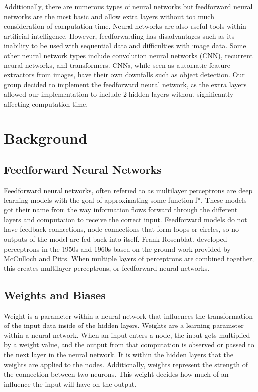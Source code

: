 \documentclass[twoside,twocolumn]{article}
\begin{document}
Additionally, there are numerous types of neural networks but feedforward neural networks are the most basic and allow extra layers without too much consideration of computation time.  Neural networks are also useful tools within artificial intelligence. However, feedforwarding has disadvantages such as its inability to be used with sequential data and difficulties with image data. Some other neural network types include convolution neural networks (CNN), recurrent neural networks, and transformers. CNNs, while seen as automatic feature extractors from images, have their own downfalls such as object detection. Our group decided to implement the feedforward neural network, as the extra layers allowed our implementation to include 2 hidden layers without significantly affecting computation time.\\


\section{Background}
\subsection{Feedforward Neural Networks}
Feedforward neural networks, often referred to as multilayer perceptrons are deep learning models with the goal of approximating some function f*. These models got their name from the way information flows forward through the different layers and computation to receive the correct input. Feedforward models do not have feedback connections, node connections that form loops or circles, so no outputs of the model are fed back into itself. Frank Rosenblatt developed perceptrons in the 1950s and 1960s based on the ground work provided by McCulloch and Pitts. When multiple layers of perceptrons are combined together, this creates multilayer perceptrons, or feedforward neural networks.\\

\subsection{Weights and Biases}
Weight is a parameter within a neural network that influences the transformation of the input data inside of the hidden layers. Weights are a learning parameter within a neural network. When an input enters a node, the input gets multiplied by a weight value, and the output from that computation is observed or passed to the next layer in the neural network. It is within the hidden layers that the weights are applied to the nodes. Additionally, weights represent the strength of the connection between two neurons. This weight decides how much of an influence the input will have on the output.\\
\end{document}
